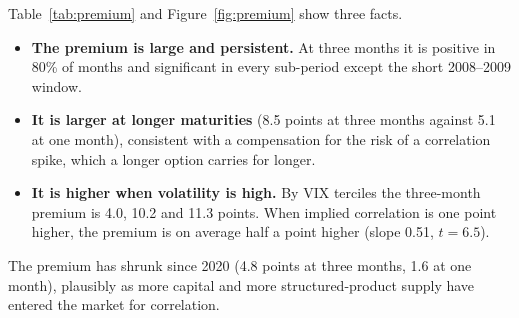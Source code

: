 \begin{table}[t]
  \centering
  \caption{Correlation risk premium: implied correlation minus the correlation realized over the life of the options. 95\% block-bootstrap confidence intervals in brackets.}
  \label{tab:premium}
\end{table}

Table~\ref{tab:premium} and Figure~\ref{fig:premium} show three facts.
\begin{itemize}
  \item \textbf{The premium is large and persistent.} At three months it is positive in 80\% of months and significant in every sub-period except the short 2008--2009 window.
  \item \textbf{It is larger at longer maturities} (8.5 points at three months against 5.1 at one month), consistent with a compensation for the risk of a correlation spike, which a longer option carries for longer.
  \item \textbf{It is higher when volatility is high.} By VIX terciles the three-month premium is 4.0, 10.2 and 11.3 points. When implied correlation is one point higher, the premium is on average half a point higher (slope 0.51, $t = 6.5$).
\end{itemize}
The premium has shrunk since 2020 (4.8 points at three months, 1.6 at one month), plausibly as more capital and more structured-product supply have entered the market for correlation.

